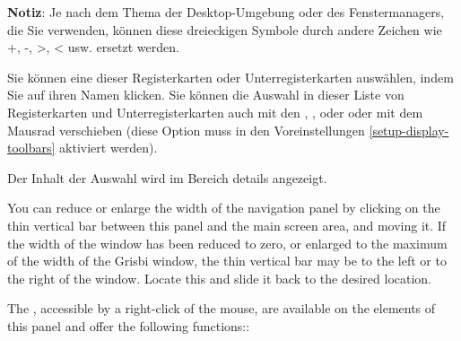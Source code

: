 
\textbf{Notiz}:  Je nach dem Thema der Desktop-Umgebung oder des Fenstermanagers, die Sie verwenden, können diese dreieckigen Symbole durch andere Zeichen wie +, -, >, < usw. ersetzt werden.%


Sie können eine dieser Registerkarten oder Unterregisterkarten auswählen, indem Sie auf ihren Namen klicken. Sie können die Auswahl in dieser Liste von Registerkarten und Unterregisterkarten auch mit den , ,  oder  oder mit dem Mausrad verschieben (diese Option muss in den Voreinstellungen \vref{setup-display-toolbars} aktiviert werden).%

Der Inhalt der Auswahl wird im Bereich details angezeigt.%


You can reduce or enlarge the width of the navigation panel by clicking on the thin vertical bar between this panel and the main screen area, and moving it. If the width of the window has been reduced to zero, or enlarged to the maximum of the width of the Grisbi window, the thin vertical bar may be to the left or to the right of the window.  Locate this and slide it back to the desired location.


The ,  accessible by a right-click of the mouse, are available on the elements of this panel and offer the following functions::


